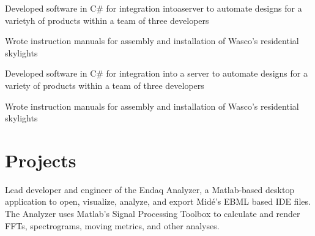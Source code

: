 \documentclass[letterpaper]{deedy-resume} %
\begin{document}
\begin{minipage}[t]{0.66\textwidth}
\sectionspace %



\begin{tightitemize}
\item Developed software in C\# for integration intoaserver to automate designs for a varietyh of products within a team of three developers
\item Wrote instruction manuals for assembly and installation of Wasco's residential skylights
\end{tightitemize}

\sectionspace %



\begin{tightitemize}
\item Developed software in C\# for integration into a server to automate designs for a variety of products within a team of three developers
\item Wrote instruction manuals for assembly and installation of Wasco's residential skylights
\end{tightitemize}

\sectionspace %

\end{minipage} 




\newpage %

\section{Projects}


Lead developer and engineer of the Endaq Analyzer, a Matlab-based desktop application to open, visualize, analyze, and export Midé's EBML based IDE files.  The Analyzer uses Matlab's Signal Processing Toolbox to calculate and render FFTs, spectrograms, moving metrics, and other analyses.  
\end{document}
